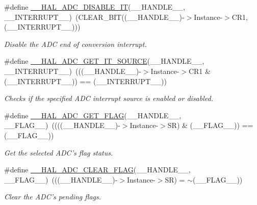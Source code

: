\begin{DoxyCompactItemize}
\#define \hyperlink{group___a_d_c___exported___macros_gadcec48b44a2133effd20f41ab227edb9}{\-\_\-\-\_\-\-H\-A\-L\-\_\-\-A\-D\-C\-\_\-\-D\-I\-S\-A\-B\-L\-E\-\_\-\-I\-T}(\-\_\-\-\_\-\-H\-A\-N\-D\-L\-E\-\_\-\-\_\-, \-\_\-\-\_\-\-I\-N\-T\-E\-R\-R\-U\-P\-T\-\_\-\-\_\-)~(C\-L\-E\-A\-R\-\_\-\-B\-I\-T((\-\_\-\-\_\-\-H\-A\-N\-D\-L\-E\-\_\-\-\_\-)-\/$>$Instance-\/$>$C\-R1, (\-\_\-\-\_\-\-I\-N\-T\-E\-R\-R\-U\-P\-T\-\_\-\-\_\-)))
\begin{DoxyCompactList}\small\item\em Disable the A\-D\-C end of conversion interrupt. \end{DoxyCompactList}\item 
\#define \hyperlink{group___a_d_c___exported___macros_gaf29cd943cb451e4ed1f07bd7d4854fb0}{\-\_\-\-\_\-\-H\-A\-L\-\_\-\-A\-D\-C\-\_\-\-G\-E\-T\-\_\-\-I\-T\-\_\-\-S\-O\-U\-R\-C\-E}(\-\_\-\-\_\-\-H\-A\-N\-D\-L\-E\-\_\-\-\_\-, \-\_\-\-\_\-\-I\-N\-T\-E\-R\-R\-U\-P\-T\-\_\-\-\_\-)~(((\-\_\-\-\_\-\-H\-A\-N\-D\-L\-E\-\_\-\-\_\-)-\/$>$Instance-\/$>$C\-R1 \& (\-\_\-\-\_\-\-I\-N\-T\-E\-R\-R\-U\-P\-T\-\_\-\-\_\-)) == (\-\_\-\-\_\-\-I\-N\-T\-E\-R\-R\-U\-P\-T\-\_\-\-\_\-))
\begin{DoxyCompactList}\small\item\em Checks if the specified A\-D\-C interrupt source is enabled or disabled. \end{DoxyCompactList}\item 
\#define \hyperlink{group___a_d_c___exported___macros_gaff951862689bb92173f803577cf2d447}{\-\_\-\-\_\-\-H\-A\-L\-\_\-\-A\-D\-C\-\_\-\-G\-E\-T\-\_\-\-F\-L\-A\-G}(\-\_\-\-\_\-\-H\-A\-N\-D\-L\-E\-\_\-\-\_\-, \-\_\-\-\_\-\-F\-L\-A\-G\-\_\-\-\_\-)~((((\-\_\-\-\_\-\-H\-A\-N\-D\-L\-E\-\_\-\-\_\-)-\/$>$Instance-\/$>$S\-R) \& (\-\_\-\-\_\-\-F\-L\-A\-G\-\_\-\-\_\-)) == (\-\_\-\-\_\-\-F\-L\-A\-G\-\_\-\-\_\-))
\begin{DoxyCompactList}\small\item\em Get the selected A\-D\-C's flag status. \end{DoxyCompactList}\item 
\#define \hyperlink{group___a_d_c___exported___macros_gafe44e1e66141bca3665bb82981a81a17}{\-\_\-\-\_\-\-H\-A\-L\-\_\-\-A\-D\-C\-\_\-\-C\-L\-E\-A\-R\-\_\-\-F\-L\-A\-G}(\-\_\-\-\_\-\-H\-A\-N\-D\-L\-E\-\_\-\-\_\-, \-\_\-\-\_\-\-F\-L\-A\-G\-\_\-\-\_\-)~(((\-\_\-\-\_\-\-H\-A\-N\-D\-L\-E\-\_\-\-\_\-)-\/$>$Instance-\/$>$S\-R) = $\sim$(\-\_\-\-\_\-\-F\-L\-A\-G\-\_\-\-\_\-))
\begin{DoxyCompactList}\small\item\em Clear the A\-D\-C's pending flags. \end{DoxyCompactList}\item 

\end{DoxyCompactItemize}

